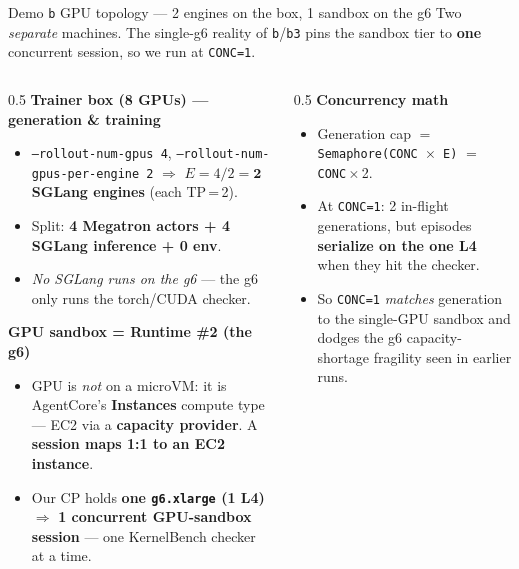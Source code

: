 \documentclass[aspectratio=169]{beamer}
\begin{document}
\begin{frame}{Demo \texttt{b} GPU topology --- 2 engines on the box, 1 sandbox on the g6}
  \footnotesize Two \emph{separate} machines. The single-g6 reality of \texttt{b}/\texttt{b3}
  pins the sandbox tier to \textbf{one} concurrent session, so we run at \texttt{CONC=1}.
  \begin{columns}[T]
  \begin{column}{0.5\textwidth}
    \textbf{Trainer box (8 GPUs) --- generation \& training}
    \begin{itemize}\scriptsize
      \item \texttt{--rollout-num-gpus 4}, \texttt{--rollout-num-gpus-per-engine 2}
        $\Rightarrow$ $E = 4/2 = \mathbf{2}$ \textbf{SGLang engines} (each TP\,=\,2).
      \item Split: \textbf{4 Megatron actors + 4 SGLang inference + 0 env}.
      \item \emph{No SGLang runs on the g6} --- the g6 only runs the torch/CUDA checker.
    \end{itemize}
    \vspace{0.1em}
    \textbf{GPU sandbox = Runtime \#2 (the g6)}
    \begin{itemize}\scriptsize
      \item GPU is \emph{not} on a microVM: it is AgentCore's \textbf{Instances} compute type ---
        EC2 via a \textbf{capacity provider}. A \textbf{session maps 1:1 to an EC2 instance}.
      \item Our CP holds \textbf{one \texttt{g6.xlarge} (1 L4)} $\Rightarrow$
        \textbf{1 concurrent GPU-sandbox session} --- one KernelBench checker at a time.
    \end{itemize}
  \end{column}
  \begin{column}{0.5\textwidth}
    \textbf{Concurrency math}
    \begin{itemize}\scriptsize
      \item Generation cap $=$ \texttt{Semaphore(CONC $\times$ E)} $=$ \texttt{CONC}\,$\times$\,2.
      \item At \texttt{CONC=1}: 2 in-flight generations, but episodes \textbf{serialize on the one L4}
        when they hit the checker.
      \item So \texttt{CONC=1} \emph{matches} generation to the single-GPU sandbox and dodges the g6
        capacity-shortage fragility seen in earlier runs.
    \end{itemize}
    \vspace{0.1em}

\end{column}
\end{columns}
\end{frame}
\end{document}
